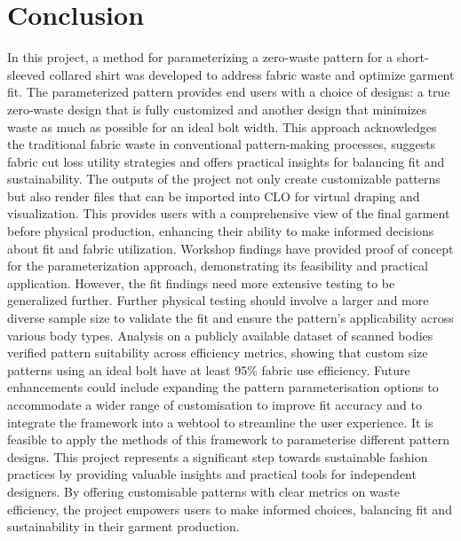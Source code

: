 \chapter{Conclusion}
In this project, a method for parameterizing a zero-waste pattern for a short-sleeved collared shirt was developed to address fabric waste and optimize garment fit. The parameterized pattern provides end users with a choice of designs: a true zero-waste design that is fully customized and another design that minimizes waste as much as possible for an ideal bolt width. This approach acknowledges the traditional fabric waste in conventional pattern-making processes, suggests fabric cut loss utility strategies and offers practical insights for balancing fit and sustainability. The outputs of the project not only create customizable patterns but also render files that can be imported into CLO for virtual draping and visualization. This provides users with a comprehensive view of the final garment before physical production, enhancing their ability to make informed decisions about fit and fabric utilization. Workshop findings have provided proof of concept for the parameterization approach, demonstrating its feasibility and practical application. However, the fit findings need more extensive testing to be generalized further. Further physical testing should involve a larger and more diverse sample size to validate the fit and ensure the pattern's applicability across various body types. Analysis on a publicly available dataset of scanned bodies verified pattern suitability across efficiency metrics, showing that custom size patterns using an ideal bolt have at least 95\% fabric use efficiency. Future enhancements could include expanding the pattern parameterisation options to accommodate a wider range of customisation to improve fit accuracy and to integrate the framework into a webtool to streamline the user experience. It is feasible to apply the methods of this framework to parameterise different pattern designs. This project represents a significant step towards sustainable fashion practices by providing valuable insights and practical tools for independent designers. By offering customisable patterns with clear metrics on waste efficiency, the project empowers users to make informed choices, balancing fit and sustainability in their garment production.